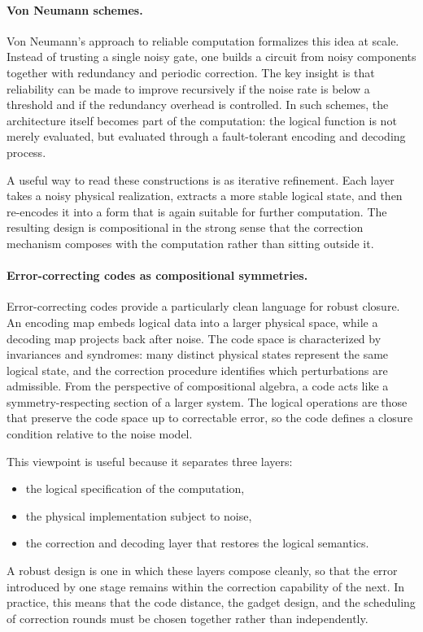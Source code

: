 \documentclass[11pt]{article}
\begin{document}
\paragraph{Von Neumann schemes.}
Von Neumann's approach to reliable computation formalizes this idea at scale. Instead of trusting a single noisy gate, one builds a circuit from noisy components together with redundancy and periodic correction. The key insight is that reliability can be made to improve recursively if the noise rate is below a threshold and if the redundancy overhead is controlled. In such schemes, the architecture itself becomes part of the computation: the logical function is not merely evaluated, but evaluated through a fault-tolerant encoding and decoding process.

A useful way to read these constructions is as iterative refinement. Each layer takes a noisy physical realization, extracts a more stable logical state, and then re-encodes it into a form that is again suitable for further computation. The resulting design is compositional in the strong sense that the correction mechanism composes with the computation rather than sitting outside it.

\paragraph{Error-correcting codes as compositional symmetries.}
Error-correcting codes provide a particularly clean language for robust closure. An encoding map embeds logical data into a larger physical space, while a decoding map projects back after noise. The code space is characterized by invariances and syndromes: many distinct physical states represent the same logical state, and the correction procedure identifies which perturbations are admissible. From the perspective of compositional algebra, a code acts like a symmetry-respecting section of a larger system. The logical operations are those that preserve the code space up to correctable error, so the code defines a closure condition relative to the noise model.

This viewpoint is useful because it separates three layers:
\begin{itemize}
  \item the logical specification of the computation,
  \item the physical implementation subject to noise,
  \item the correction and decoding layer that restores the logical semantics.
\end{itemize}
A robust design is one in which these layers compose cleanly, so that the error introduced by one stage remains within the correction capability of the next. In practice, this means that the code distance, the gadget design, and the scheduling of correction rounds must be chosen together rather than independently.
\end{document}
